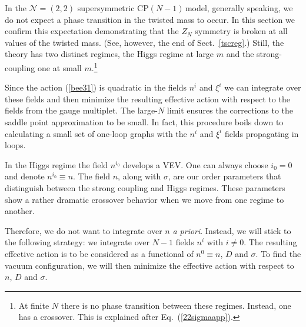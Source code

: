 \documentclass[epsfig,12pt]{article}
\newcommand{\cpn}{CP$(N-1)\,$}
\newcommand{\ntwot}{${\mathcal N}= \left(2,2\right) $ }
\begin{document}
In the \ntwot supersymmetric \cpn model, generally speaking,  we do not expect a phase transition
in the 
twisted mass to occur.  In this section we confirm this expectation demonstrating
that the $Z_N$ symmetry is  broken at all values of the twisted mass. 
(See, however, the end of Sect.~\ref{tscreg}.)
Still, the theory has two 
distinct regimes, the Higgs regime at large $m$ and the  strong-coupling one 
at small $m$.\footnote{At finite $N$ there is no phase transition between these regimes. Instead, one has a crossover. This is explained after Eq.~(\ref{22sigmaapp}).}

Since the action (\ref{bee31}) is quadratic in the fields $n^{i}$ and $\xi^i$
we can integrate over these fields and then minimize the resulting
effective action with respect to the  fields from the gauge multiplet. The large-$N$ limit ensures the corrections to the saddle point approximation to be  small. In fact,
this procedure boils down to calculating a small set of one-loop graphs with the
$n^{i}$ and $\xi^i$  fields propagating in loops.

In the Higgs regime the field $n^{i_0}$ develops a VEV.
One can always choose $i_0=0$ and denote $n^{i_0}\equiv n$. 
The field $n$, along with $\sigma$, are
our order parameters that distinguish between the
strong coupling  and Higgs regimes. These parameters show a rather dramatic crossover behavior
when we move from one regime to another.

Therefore, we do not want
to integrate over $n$ {\em a priori}. Instead,
we will stick to the following strategy:  we integrate over $N-1$
fields $n^{i}$ with $i \ne 0$.
The resulting effective action is to be considered as
a functional of $n^0\equiv n$, $D$ and
$\sigma$. To find the vacuum configuration, we will then minimize the
effective action with
respect to $n$, $D$ and
$\sigma$.
\end{document}
